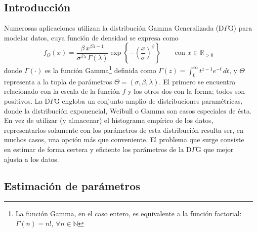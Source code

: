 \documentclass[a4paper,10pt,twoside]{article}
\begin{document}
\newcommand{\real}{\mathbb{R}}
\newcommand{\nat}{\mathbb{N}}
\newcommand{\eme}{\mathcal{M}}
\newcommand{\emeh}{\widehat{\mathcal{M}}}
\newcommand{\ere}{\mathcal{R}}

\subsection{Introducci\'on}

Numerosas aplicaciones utilizan la distribuci\'on Gamma Generalizada (D$\Gamma$G) para modelar datos, cuya funci\'on de densidad se expresa como $$f_\Theta(x)=\frac{\beta\, x^{\beta \lambda - 1}}{\sigma^{\beta \lambda}\, \Gamma(\lambda)} \exp\left\{-\left(\frac{x}{\sigma} \right)^\beta \right\}\qquad\textrm{con } x\in\real_{>0}$$ donde 
$\Gamma(\cdot)$ es la funci\'on Gamma\footnote{La funci\'on Gamma, en el caso entero, es equivalente a la funci\'on factorial: $\Gamma(n)=n!$, $\forall n\in\nat$ } definida como $\Gamma(z)=\int_0^{\infty}{t^{z-1}e^{-t}\,dt}$, y $\Theta$ representa a la tupla de par\'ametros $\Theta=(\sigma,\beta,\lambda)$. El primero se encuentra relacionado con la escala de la funci\'on $f$ y los otros dos con la forma; todos son positivos.
La D$\Gamma$G engloba un conjunto amplio de distribuciones param\'etricas, donde la distribuci\'on exponencial, Weibull o Gamma son casos especiales de \'esta.
En vez de utilizar (y almacenar) el histograma emp\'irico de los datos, representarlos solamente con los par\'ametros de esta distribuci\'on resulta ser, en muchos casos, una opci\'on m\'as que conveniente. El problema que surge consiste en estimar de forma certera y eficiente los par\'ametros de la D$\Gamma$G que mejor ajusta a los datos.

\subsection{Estimaci\'on de par\'ametros}
\end{document}
